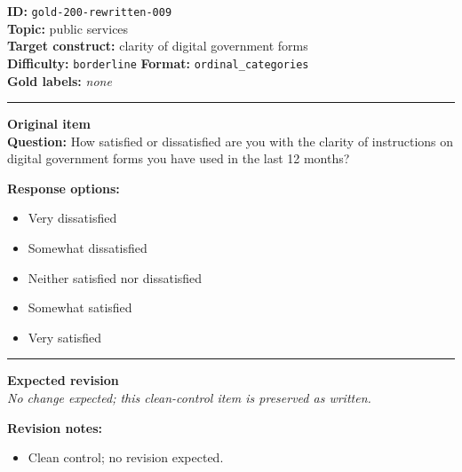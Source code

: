 \documentclass[10pt,a4paper]{article}
\newcommand{\sectionline}{\vspace{0.15em}\hrule\vspace{0.35em}}
\begin{document}
\begin{tcolorbox}[colframe=CleanGreen,colback=white,colbacktitle=CleanGreen!9,coltitle=black,title={Item 009\hfill Clean control}]
\textbf{ID:} \texttt{gold-200-rewritten-009}\\
\textbf{Topic:} public services\\
\textbf{Target construct:} clarity of digital government forms\\
\textbf{Difficulty:} \texttt{borderline} \quad \textbf{Format:} \texttt{ordinal\_categories}\\
\textbf{Gold labels:} \textit{none}\\
\sectionline
\textbf{Original item}\\
\textbf{Question:} How satisfied or dissatisfied are you with the clarity of instructions on digital government forms you have used in the last 12 months?
\par\textbf{Response options:}
\begin{itemize}
\item Very dissatisfied
\item Somewhat dissatisfied
\item Neither satisfied nor dissatisfied
\item Somewhat satisfied
\item Very satisfied
\end{itemize}
\sectionline
\textbf{Expected revision}\\
\textit{No change expected; this clean-control item is preserved as written.}
\par\textbf{Revision notes:}
\begin{itemize}
\item Clean control; no revision expected.
\end{itemize}
\end{tcolorbox}
\end{document}
